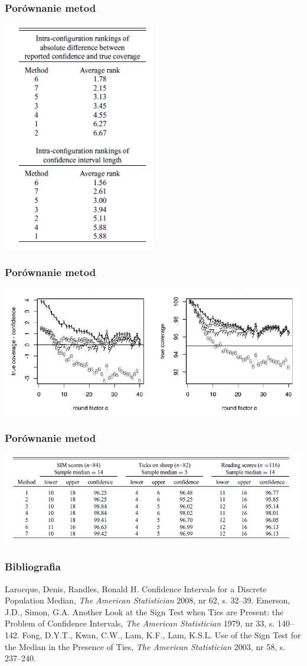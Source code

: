\documentclass[11pt,usenames,dvipsnames,svgnames,x11names]{beamer}
\theoremstyle{plain}
\theoremstyle{definition}
\theoremstyle{remark}
\begin{document}
\begin{frame}
\frametitle{Porównanie metod}
\centering
\includegraphics[width=0.5\textwidth]{4.png}
\end{frame}

\begin{frame}
\frametitle{Porównanie metod}
\includegraphics[width=\textwidth]{3.png}
\end{frame}

\begin{frame}
\frametitle{Porównanie metod}
\includegraphics[width=\textwidth]{5.png}
\end{frame}

\begin{frame}
\frametitle{Bibliografia}
\begin{thebibliography}{9}
 Larocque, Denis, Randles, Ronald H. Confidence Intervals for a Discrete Population Median, \emph{The American Statistician} 2008, nr 62, s. 32--39.
 Emerson, J.D., Simon, G.A. Another Look at the Sign Test when Ties are Present: the Problem of Confidence Intervals, \emph{The American Statistician} 1979, nr 33, s. 140--142.
 Fong, D.Y.T., Kwan, C.W., Lam, K.F., Lam, K.S.L. Use of the Sign Test for the Median in the Presence of Ties, \emph{The American Statistician} 2003, nr 58, s. 237--240.
\end{thebibliography}
\end{frame}
\end{document}
